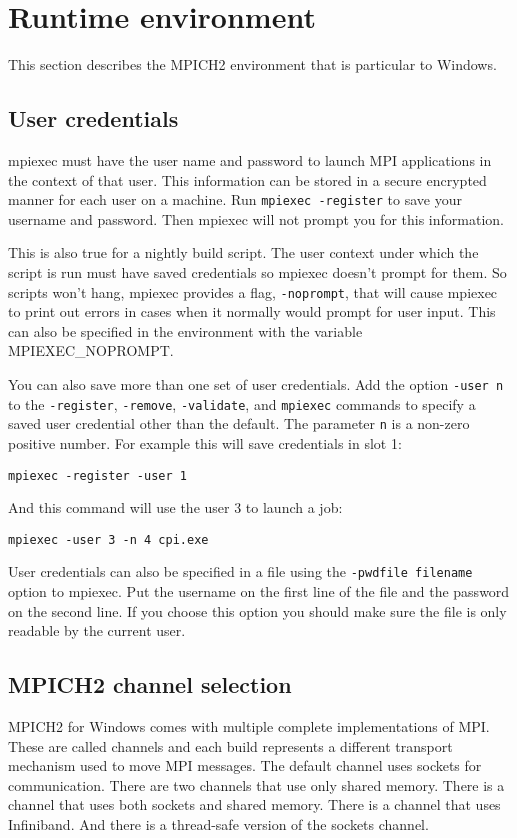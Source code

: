 \documentclass[dvipdfm,11pt]{article}
\begin{document}
\section{Runtime environment}

This section describes the MPICH2 environment that is particular to Windows.

\subsection{User credentials}
mpiexec must have the user name and password to launch MPI applications in the context of
that user.  This information can be stored in a secure encrypted manner for each user on a
machine.  Run \texttt{mpiexec -register} to save your username and password.  Then mpiexec
will not prompt you for this information.

This is also true for a nightly build script.  The user context under which the script is 
run must have saved credentials so mpiexec doesn't prompt for them.  So scripts won't hang,
mpiexec provides a flag, \texttt{-noprompt}, that will cause mpiexec to print out errors in 
cases when it normally would prompt for user input.  This can also be specified in the 
environment with the variable MPIEXEC\_NOPROMPT.

You can also save more than one set of user credentials.  Add the option \texttt{-user n}
to the \texttt{-register}, \texttt{-remove}, \texttt{-validate}, and \texttt{mpiexec}
commands to specify a saved user credential other than the default.  The parameter \texttt{n}
is a non-zero positive number.  For example this will save credentials in slot 1:
\begin{verbatim}
mpiexec -register -user 1
\end{verbatim}
And this command will use the user 3 to launch a job:
\begin{verbatim}
mpiexec -user 3 -n 4 cpi.exe
\end{verbatim}

User credentials can also be specified in a file using the \texttt{-pwdfile filename}
option to mpiexec.  Put the username on the first line of the file and the password
on the second line.  If you choose this option you should make sure the file is
only readable by the current user.

\subsection{MPICH2 channel selection}
MPICH2 for Windows comes with multiple complete implementations of MPI.  These are called
channels and each build represents a different transport mechanism used to move MPI messages.
The default channel uses sockets for communication.  There are two channels that use only
shared memory.  There is a channel that uses both sockets and shared memory.  There is a
channel that uses Infiniband.  And there is a thread-safe version of the sockets channel.
\end{document}
